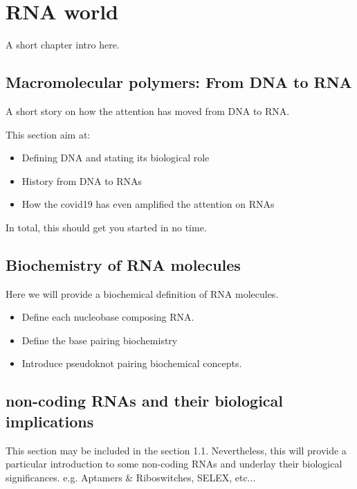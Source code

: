 \chapter{RNA world}\label{ch:introduction}
A short chapter intro here.

\section{Macromolecular polymers: From DNA to RNA}
A short story on how the attention has moved from DNA to RNA. 

This section aim at: 

\begin{itemize}
    \item Defining DNA and stating its biological role
   	
   	\item History from DNA to RNAs

    \item How the covid19 has even amplified the attention on RNAs
\end{itemize}
In total, this should get you started in no time.

\section{Biochemistry of RNA molecules}\label{sec:rna_biochemical}
Here we will provide a biochemical definition of RNA molecules. 

\begin{itemize}
    \item Define each nucleobase composing RNA. 
    
    \item Define the base pairing biochemistry 
    
    \item Introduce pseudoknot pairing biochemical concepts.

\end{itemize}


\section{non-coding RNAs and their biological implications}\label{sec:custom}

This section may be included in the section 1.1.  Nevertheless, this will provide a particular introduction to some non-coding RNAs and underlay their biological significances. e.g. Aptamers \& Riboswitches, SELEX, etc...

